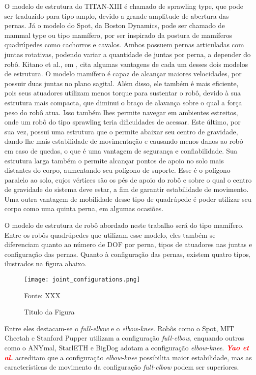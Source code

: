 \documentclass[../main.tex]{subfiles}
\begin{document}
  O modelo de estrutura do TITAN-XIII é chamado de sprawling type, que pode ser traduzido para tipo amplo, devido a grande amplitude de abertura das pernas. Já o modelo do Spot, da Boston Dynamics, pode ser chamado de mammal type ou tipo mamífero, por ser inspirado da postura de mamíferos quadrúpedes como cachorros e cavalos. Ambos possuem pernas articuladas com juntas rotativas, podendo variar a quantidade de juntas por perna, a depender do robô. Kitano et al., em \cite{Kitano2016}, cita algumas vantagens de cada um desses dois modelos de estrutura. O modelo mamífero é capaz de alcançar maiores velocidades, por possuir duas juntas no plano sagital. Além disso, ele também é mais eficiente, pois seus atuadores utilizam menos torque para sustentar o robô, devido à sua estrutura mais compacta, que diminui o braço de alavança sobre o qual a força peso do robô atua. Isso também lhes permite navegar em ambientes estreitos, onde um robô do tipo sprawling teria dificuldades de acessar. Este último, por sua vez, possui uma estrutura que o permite abaixar seu centro de gravidade, dando-lhe mais estabilidade de movimentação e causando menos danos ao robô em caso de quedas, o que é uma vantagem de segurança e confiabilidade. Sua estrutura larga também o permite alcançar pontos de apoio no solo mais distantes do corpo, aumentando seu polígono de suporte. Esse é o polígono paralelo ao solo, cujos vértices são os pés de apoio do robô e sobre o qual o centro de gravidade do sistema deve estar, a fim de garantir estabilidade de movimento. Uma outra vantagem de mobilidade desse tipo de quadrúpede é poder utilizar seu corpo como uma quinta perna, em algumas ocasiões.

  O modelo de estrutura de robô abordado neste trabalho será do tipo mamífero. Entre os robôs quadrúpedes que utilizam esse modelo, eles também se diferenciam quanto ao número de DOF por perna, tipos de atuadores nas juntas e configuração das pernas. Quanto à configuração das pernas, existem quatro tipos, ilustrados na figura abaixo.

  \begin{figure}[h]
    \centering
    \caption{Titulo da Figura}
    \texttt{[image: joint\_configurations.png]}
    
    Fonte: XXX
    \label{fig:joint_configurations}
  \end{figure}

  Entre eles destacam-se o \textit{full-elbow} e o \textit{elbow-knee}. Robôs como o Spot, MIT Cheetah e Stanford Pupper utilizam a configuração \textit{full-elbow}, enquando outros como o ANYmal, StarlETH e BigDog adotam a configuração  \textit{elbow-knee}. \textbf{\textcolor{red}{\textit{Yao et al.}}} acreditam que a configuração \textit{elbow-knee} possibilita maior estabilidade, mas as características de movimento da configuração \textit{full-elbow} podem ser superiores.
\end{document}
